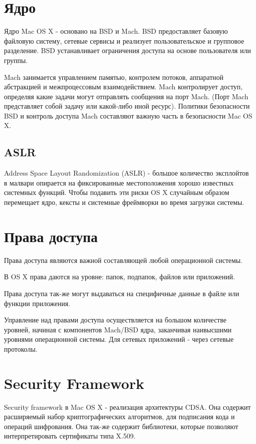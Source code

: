 \documentclass[12pt, a4paper]{article}
\begin{document}
\section{Ядро}

Ядро Mac OS X - основано на BSD и Mach. BSD предоставляет базовую файловую систему, сетевые сервисы и реализует пользовательское и групповое разделение. BSD устанавливает ограничения доступа на основе пользователя или группы.

Mach занимается управлением памятью, контролем потоков, аппаратной абстракцией и межпроцессовым взаимодействием. Mach контролирует доступ, определяя какие задачи могут отправлять сообщения на порт Mach. (Порт Mach представляет собой задачу или какой-либо иной ресурс). Политики безопасности BSD и контроль доступа Mach составляют важную часть в безопасности Mac OS X.

\subsection{ASLR}

Address Space Layout Randomization (ASLR) - большое количество эксплойтов в малвари опирается на фиксированные местоположения хорошо известных системных функций. Чтобы подавить эти риски OS X случайным образом перемещает ядро, кексты и системные фреймворки во время загрузки системы.

\section{Права доступа}

Права доступа являются важной составляющей любой операционной системы.

В OS X права даются на уровне: папок, подпапок, файлов или приложений.

Права доступа так-же могут выдаваться на специфичные данные в файле или функции приложения.

Управление над правами доступа осуществляется на большом количестве уровней, начиная с компонентов Mach/BSD ядра, заканчивая наивысшими уровнями операционной системы. Для сетевых приложений - через сетевые протоколы.

\section{Security Framework}

Security framework в Mac OS X - реализация архитектуры CDSA. Она содержит расширяемый набор криптографических алгоритмов, для подписания кода и операций шифрования. Она так-же содержит библиотеки, которые позволяют интерпретировать сертификаты типа X.509.
\end{document}
